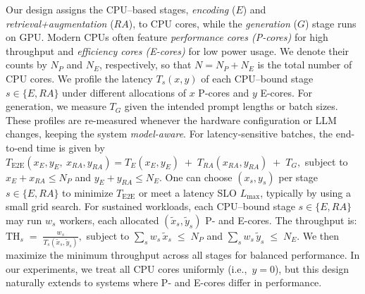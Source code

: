 Our design assigns the CPU--based stages, \emph{encoding} ($E$) and \emph{retrieval+augmentation} ($RA$), to CPU cores, while the \emph{generation} ($G$) stage runs on GPU. Modern CPUs often feature \emph{performance cores (P-cores)} for high throughput and \emph{efficiency cores (E-cores)} for low power usage. We denote their counts by $N_{P}$ and $N_{E}$, respectively, so that $N = N_{P} + N_{E}$ is the total number of CPU cores.
We profile the latency $T_{s}(x,y)$ of each CPU--bound stage $s \in \{E,RA\}$ under different allocations of $x$ P-cores and $y$ E-cores. For generation, we measure $T_{G}$ given the intended prompt lengths or batch sizes. These profiles are re-measured whenever the hardware configuration or LLM changes, keeping the system \emph{model-aware}.
For latency-sensitive batches, the end-to-end time is given by
$T_{\mathrm{E2E}}(x_E,y_E,\ x_{RA},y_{RA}) = T_E(x_E,y_E)\;+\;T_{RA}(x_{RA},y_{RA})\;+\;T_G,$
subject to $x_E + x_{RA} \le N_{P}$ and $y_E + y_{RA} \le N_{E}$. One can choose $(x_s,y_s)$ per stage $s\in\{E,RA\}$ to minimize $T_{\mathrm{E2E}}$ or meet a latency SLO $L_{\max}$, typically by using a small grid search.
For sustained workloads, each CPU--bound stage $s\in\{E,RA\}$ may run $w_{s}$ workers, each allocated $(\tilde{x}_s,\tilde{y}_s)$ P- and E-cores. The throughput is: 
$
  \mathrm{TH}_s
  \;=\;
  \frac{w_{s}}{T_{s}(\tilde{x}_s,\tilde{y}_s)},
$
subject to $\sum_{s} w_{s}\,\tilde{x}_s \;\le\; N_{P}$ and 
$\sum_{s} w_{s}\,\tilde{y}_s \;\le\; N_{E}$. We then maximize the minimum throughput across all stages %
for balanced performance. In our experiments, we treat all CPU cores uniformly (i.e.,\ $y=0$), but this design naturally extends to systems where P- and E-cores differ in performance. 

